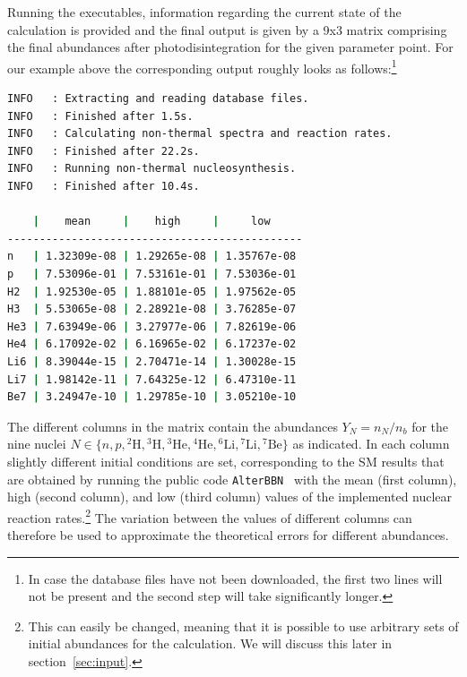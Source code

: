 \documentclass[11pt,a4paper]{article}
\begin{document}
Running the executables, information regarding the current state of the calculation is provided and the final output is given by a 9x3 matrix comprising the final abundances after photodisintegration for the given parameter point. For our example above the corresponding output roughly looks as follows:\footnote{In case the database files have not been downloaded, the first two lines will not be present and the second step will take significantly longer.}
%
\begin{lstlisting}[language=bash, backgroundcolor=\color{white}]
INFO   : Extracting and reading database files.
INFO   : Finished after 1.5s.
INFO   : Calculating non-thermal spectra and reaction rates.
INFO   : Finished after 22.2s.
INFO   : Running non-thermal nucleosynthesis.
INFO   : Finished after 10.4s.

    |    mean     |    high     |     low    
----------------------------------------------
n   | 1.32309e-08 | 1.29265e-08 | 1.35767e-08
p   | 7.53096e-01 | 7.53161e-01 | 7.53036e-01
H2  | 1.92530e-05 | 1.88101e-05 | 1.97562e-05
H3  | 5.53065e-08 | 2.28921e-08 | 3.76285e-07
He3 | 7.63949e-06 | 3.27977e-06 | 7.82619e-06
He4 | 6.17092e-02 | 6.16965e-02 | 6.17237e-02
Li6 | 8.39044e-15 | 2.70471e-14 | 1.30028e-15
Li7 | 1.98142e-11 | 7.64325e-12 | 6.47310e-11
Be7 | 3.24947e-10 | 1.29785e-10 | 3.05210e-10

\end{lstlisting}
\vspace{5mm}
The different columns in the matrix contain the abundances $Y_N = n_N/n_b$ for the nine nuclei $N\in\{n, p, {}^2\text{H}, {}^3\text{H}, {}^3\text{He}, {}^4\text{He}, {}^6\text{Li}, {}^7\text{Li}, {}^7\text{Be}\}$ as indicated. In each column slightly different initial conditions are set,
corresponding to the SM results that are obtained by running the public code \texttt{AlterBBN}~\cite{Arbey:2011nf,Arbey:2018zfh} with the mean (first column), high (second column), and low (third column) values of the implemented nuclear reaction rates.\footnote{This can easily be changed, meaning that it is possible to use arbitrary sets of initial abundances for the calculation. We will discuss this later in section~\ref{sec:input}.}
The variation between the values of different columns can therefore be used to approximate the  theoretical errors for different abundances.
\end{document}
